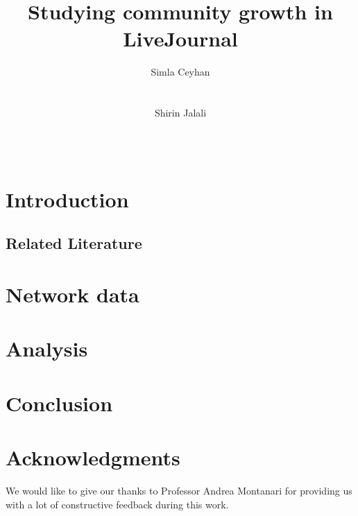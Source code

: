 \documentclass{sig-alternate}
\begin{document}
\newcommand{\Cc}{\mathcal{C}}
\newcommand{\Vc}{\mathcal{V}}
\newcommand{\Ec}{\mathcal{V}}


\title{Studying  community growth in LiveJournal}
\author{
\alignauthor
Simla Ceyhan\\
       \\
       \\
\alignauthor
Shirin Jalali\\
       \\
       \\
       }

\maketitle
\begin{abstract}

\end{abstract}



\section{Introduction}
\label{sec:intro}


\subsection{Related Literature}
\label{sec:related}


\section{Network data}
\label{sec:network}


 
\section{Analysis}
\label{sec:analysis}


\section{Conclusion}
\label{sec:conclusion}



\section*{Acknowledgments}

We would like to give our thanks to Professor Andrea Montanari for providing us with a lot of  constructive feedback during this work.


 
\end{document}
